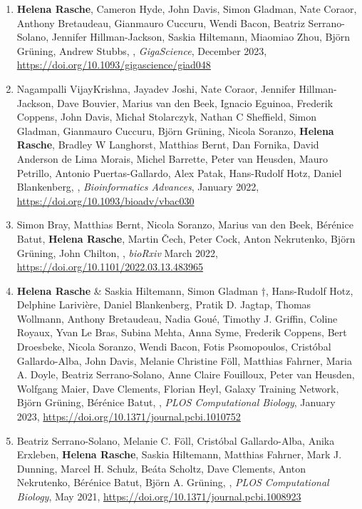 \begin{enumerate}
\item \textbf{Helena Rasche}, Cameron Hyde, John Davis, Simon Gladman, Nate Coraor, Anthony Bretaudeau, Gianmauro Cuccuru, Wendi Bacon, Beatriz Serrano-Solano, Jennifer Hillman-Jackson, Saskia Hiltemann, Miaomiao Zhou, Björn Grüning, Andrew Stubbs, {\color{chaptergrey}{Training Infrastructure as a Service}}, \textit{GigaScience}, December 2023, \url{https://doi.org/10.1093/gigascience/giad048} \label{tiaas}

\item  Nagampalli VijayKrishna, Jayadev Joshi, Nate Coraor, Jennifer Hillman-Jackson, Dave Bouvier, Marius van den Beek, Ignacio Eguinoa, Frederik Coppens, John Davis, Michał Stolarczyk, Nathan C Sheffield, Simon Gladman, Gianmauro Cuccuru, Björn Grüning, Nicola Soranzo, \textbf{Helena Rasche}, Bradley W Langhorst, Matthias Bernt, Dan Fornika, David Anderson de Lima Morais, Michel Barrette, Peter van Heusden, Mauro Petrillo, Antonio Puertas-Gallardo, Alex Patak, Hans-Rudolf Hotz, Daniel Blankenberg, {\color{chaptergrey}{Expanding the Galaxy’s reference data}}, \textit{Bioinformatics Advances}, January 2022, \url{https://doi.org/10.1093/bioadv/vbac030}

\item Simon Bray, Matthias Bernt, Nicola Soranzo, Marius van den Beek, Bérénice Batut, \textbf{Helena Rasche}, Martin Čech, Peter Cock, Anton Nekrutenko, Björn Grüning, John Chilton, {\color{chaptergrey}{Planemo: a command-line toolkit for developing, deploying, and executing scientific data analyses}}, \textit{bioRxiv} March 2022, \url{https://doi.org/10.1101/2022.03.13.483965}

\item \textbf{Helena Rasche} \& Saskia Hiltemann, Simon Gladman †, Hans-Rudolf Hotz, Delphine Larivière, Daniel Blankenberg, Pratik D. Jagtap, Thomas Wollmann, Anthony Bretaudeau, Nadia Goué, Timothy J. Griffin, Coline Royaux, Yvan Le Bras, Subina Mehta, Anna Syme, Frederik Coppens, Bert Droesbeke, Nicola Soranzo, Wendi Bacon, Fotis Psomopoulos, Cristóbal Gallardo-Alba, John Davis, Melanie Christine Föll, Matthias Fahrner, Maria A. Doyle, Beatriz Serrano-Solano, Anne Claire Fouilloux, Peter van Heusden, Wolfgang Maier, Dave Clements, Florian Heyl, Galaxy Training Network, Björn Grüning, Bérénice Batut, {\color{chaptergrey}{Galaxy Training: A powerful framework for teaching!}}, \textit{PLOS Computational Biology}, January 2023, \url{https://doi.org/10.1371/journal.pcbi.1010752}\label{gtn}

\item Beatriz Serrano-Solano, Melanie C. Föll, Cristóbal Gallardo-Alba, Anika Erxleben, \textbf{Helena Rasche}, Saskia Hiltemann, Matthias Fahrner, Mark J. Dunning, Marcel H. Schulz, Beáta Scholtz, Dave Clements, Anton Nekrutenko, Bérénice Batut, Björn A. Grüning, {\color{chaptergrey}{Fostering accessible online education using Galaxy as an e-learning platform}}, \textit{PLOS Computational Biology}, May 2021, \url{https://doi.org/10.1371/journal.pcbi.1008923}


\end{enumerate}
